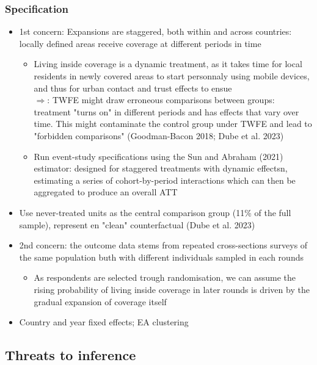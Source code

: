 \documentclass[11pt]{article}
\begin{document}
\subsubsection*{Specification}
\begin{itemize}
    \item 1st concern: Expansions are staggered, both within and across countries: locally defined areas receive coverage at different periods in time
    \begin{itemize}
\item Living inside coverage is a dynamic treatment, as it takes time for local residents in newly covered areas to start personnaly using mobile devices, and thus for urban contact and trust effects to ensue
    \\
    $\Rightarrow$: TWFE might draw erroneous comparisons between groups: treatment "turns on" in different periods and has effects that vary over time. This might contaminate the control group under TWFE and lead to "forbidden comparisons" (Goodman-Bacon 2018; Dube et al. 2023)
    \item Run event-study specifications using the Sun and Abraham (2021) estimator: designed for staggered treatments with dynamic effectsn, estimating a series of cohort-by-period interactions which can then be aggregated to produce an overall ATT
\end{itemize}
\end{itemize}
\begin{itemize}
    \item Use never-treated units as the central comparison group (11\% of the full sample), represent en "clean" counterfactual (Dube et al. 2023)
    \item 2nd concern: the outcome data stems from repeated cross-sections surveys of the same population buth with different individuals sampled in each rounds
    \begin{itemize}
    \item As respondents are selected trough randomisation, we can assume the rising probability of living inside coverage in later rounds is driven by the gradual expansion of coverage itself
\end{itemize}
    \item Country and year fixed effects; EA clustering
\end{itemize}

\subsection*{Threats to inference}
\end{document}
